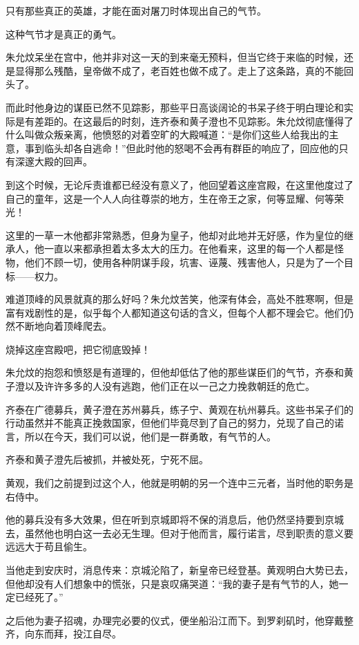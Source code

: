 \begin{multicols}{\theparacolNo}
		只有那些真正的英雄，才能在面对屠刀时体现出自己的气节。

		这种气节才是真正的勇气。

		朱允炆呆坐在宫中，他并非对这一天的到来毫无预料，但当它终于来临的时候，还是显得那么残酷，皇帝做不成了，老百姓也做不成了。走上了这条路，真的不能回头了。

		而此时他身边的谋臣已然不见踪影，那些平日高谈阔论的书呆子终于明白理论和实际是有差距的。在这最后的时刻，连齐泰和黄子澄也不见踪影。朱允炆彻底懂得了什么叫做众叛亲离，他愤怒的对着空旷的大殿喊道：“是你们这些人给我出的主意，事到临头却各自逃命！”但此时他的怒喝不会再有群臣的响应了，回应他的只有深邃大殿的回声。

		到这个时候，无论斥责谁都已经没有意义了，他回望着这座宫殿，在这里他度过了自己的童年，这是一个人人向往尊崇的地方，生在帝王之家，何等显耀、何等荣光！

		这里的一草一木他都非常熟悉，但身为皇子，他却对此地并无好感，作为皇位的继承人，他一直以来都承担着太多太大的压力。在他看来，这里的每一个人都是怪物，他们不顾一切，使用各种阴谋手段，坑害、诬蔑、残害他人，只是为了一个目标——权力。

		难道顶峰的风景就真的那么好吗？朱允炆苦笑，他深有体会，高处不胜寒啊，但是富有戏剧性的是，似乎每个人都知道这句话的含义，但每个人都不理会它。他们仍然不断地向着顶峰爬去。

		烧掉这座宫殿吧，把它彻底毁掉！

		朱允炆的抱怨和愤怒是有道理的，但他却低估了他的那些谋臣们的气节，齐泰和黄子澄以及许许多多的人没有逃跑，他们正在以一己之力挽救朝廷的危亡。

		齐泰在广德募兵，黄子澄在苏州募兵，练子宁、黄观在杭州募兵。这些书呆子们的行动虽然并不能真正挽救国家，但他们毕竟尽到了自己的努力，兑现了自己的诺言，所以在今天，我们可以说，他们是一群勇敢，有气节的人。

		齐泰和黄子澄先后被抓，并被处死，宁死不屈。

		黄观，我们之前提到过这个人，他就是明朝的另一个连中三元者，当时他的职务是右侍中。

		他的募兵没有多大效果，但在听到京城即将不保的消息后，他仍然坚持要到京城去，虽然他也明白这一去必无生理。但对于他而言，履行诺言，尽到职责的意义要远远大于苟且偷生。

		当他走到安庆时，消息传来：京城沦陷了，新皇帝已经登基。黄观明白大势已去，但他却没有人们想象中的慌张，只是哀叹痛哭道：“我的妻子是有气节的人，她一定已经死了。”

		之后他为妻子招魂，办理完必要的仪式，便坐船沿江而下。到罗刹矶时，他穿戴整齐，向东而拜，投江自尽。


\end{multicols}

